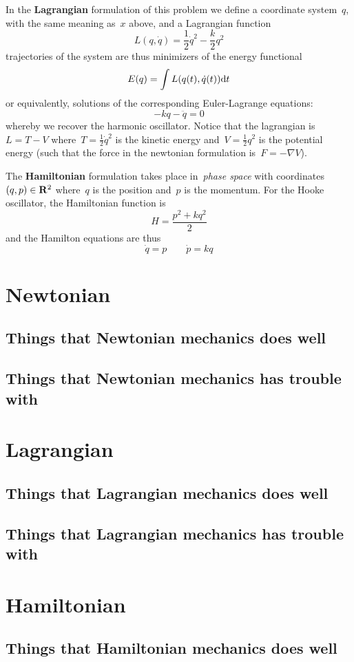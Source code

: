 In the {\bf Lagrangian} formulation of this problem we define a coordinate
system~$q$, with the same meaning as~$x$ above, and a Lagrangian function
\[
	L(q,\dot q) = \frac12\dot q^2-\frac k2q^2
\]
trajectories of the system are thus minimizers of the energy functional
\[
	E(q) = \int L(q(t), \dot q(t))\mathrm{d} t
\]
or equivalently, solutions of the corresponding Euler-Lagrange equations:
\[
	-kq -\ddot q = 0
\]
whereby we recover the harmonic oscillator.
Notice that the lagrangian is~$L=T-V$ where~$T=\frac12\dot q^2$ is the
kinetic energy and~$V=\frac12 q^2$ is the potential energy (such that the
force in the newtonian formulation is~$F=-\nabla V$).

The {\bf Hamiltonian} formulation takes place in~\emph{phase space}
with coordinates~$(q,p)\in\mathbf{R}^2$ where~$q$ is the position and~$p$ is the
momentum.  For the Hooke oscillator, the Hamiltonian function is
\[
	H = \frac{p^2 + kq^2}2
\]
and the Hamilton equations are thus
\[
	\dot q = p
	\qquad
	\dot p = kq
\]




\section{Newtonian}

\subsection{Things that Newtonian mechanics does well}

\subsection{Things that Newtonian mechanics has trouble with}

\section{Lagrangian}

\subsection{Things that Lagrangian mechanics does well}

\subsection{Things that Lagrangian mechanics has trouble with}


\section{Hamiltonian}

\subsection{Things that Hamiltonian mechanics does well}

